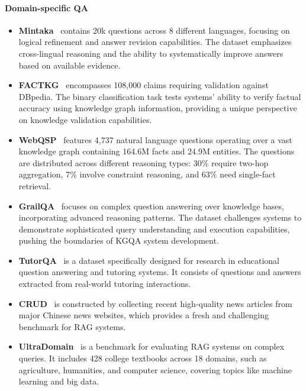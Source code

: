 \documentclass[lettersize,journal]{IEEEtran}
\begin{document}
\paragraph{Domain-specific QA}
\begin{itemize}
    \item \textbf{Mintaka}~\cite{sen2022mintaka} contains 20k questions across 8 different languages, focusing on logical refinement and answer revision capabilities. The dataset emphasizes cross-lingual reasoning and the ability to systematically improve answers based on available evidence.
    \item \textbf{FACTKG}~\cite{kim2023factkg} encompasses 108,000 claims requiring validation against DBpedia. The binary classification task tests systems' ability to verify factual accuracy using knowledge graph information, providing a unique perspective on knowledge validation capabilities.
    \item \textbf{WebQSP}~\cite{yih2016value} features 4,737 natural language questions operating over a vast knowledge graph containing 164.6M facts and 24.9M entities. The questions are distributed across different reasoning types: 30\% require two-hop aggregation, 7\% involve constraint reasoning, and 63\% need single-fact retrieval.
    \item \textbf{GrailQA}~\cite{gu2021beyond} focuses on complex question answering over knowledge bases, incorporating advanced reasoning patterns. The dataset challenges systems to demonstrate sophisticated query understanding and execution capabilities, pushing the boundaries of KGQA system development.
    \item \textbf{TutorQA}~\cite{yang2024graphusion} is a dataset specifically designed for research in educational question answering and tutoring systems. It consists of questions and answers extracted from real-world tutoring interactions. 
    \item \textbf{CRUD}~\cite{lyu2024crud} is constructed by collecting recent high-quality news articles from major Chinese news websites, which provides a fresh and challenging benchmark for RAG systems.
    \item \textbf{UltraDomain}~\cite{qian2024memorag} is a benchmark for evaluating RAG systems on complex queries. It includes 428 college textbooks across 18 domains, such as agriculture, humanities, and computer science, covering topics like machine learning and big data. 
\end{itemize}
\end{document}
